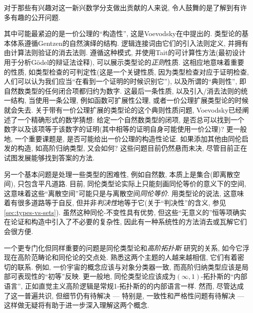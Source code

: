 %

对于那些有兴趣对这一新兴数学分支做出贡献的人来说, 令人鼓舞的是了解到有许多有趣的公开问题. 

%
其中可能最紧迫的是一价公理的``构造性'', 这是Voevodsky在\cite{Universe-poly}中提出的. 
类型论的基本体系遵循Gentzen的自然演绎的结构. 逻辑连接词由它们的引入法则定义, 并拥有由计算法则验证的消去法则. 遵循这种模式, 并使用Tait的可计算性方法(最初设计用于分析G\"odel的辩证法诠释), 可以展示类型论的\emph{正则}性质. 
这相应地意味着重要的性质, 如类型检查的可判定性(这是一个关键性质, 因为类型检查对应于证明检查, 人们可以认为我们应当``在看到一个证明的时候识别它''), 以及所谓的``典则性'', 即自然数类型的任何闭合项都归约为数字. 
这最后一条性质, 以及引入/消去法则的统一结构, 当使用一条公理, 例如函数可扩展性公理, 或者一价公理扩展类型论的时候就会失去.  
关于带有一价公理扩展的类型论的这个典则性质问题, Voevodsky已经阐述了一个精确形式的数学猜想: 给定一个自然数类型的闭项, 是否总可以找到一个数字以及该项等于该数字的证明(其中相等的证明自身可能使用一价公理)? 更一般地, 一个重要课题是, 是否可能给出一价公理的构造性论证. 
如果添加其他由同伦启发的构造, 如高阶归纳类型, 又会如何? 
这些问题目前仍然悬而未决, 尽管目前正在试图发展能够找到答案的方法.  

另一个基本问题是处理一些类型的困难性, 例如自然数, 本质上是集合(即离散空间), 
%
只包含平凡道路. 
目前, 同伦类型论实际上只能刻画同伦等价的意义下的空间, 这意味着这些``离散空间''可能只是与离散空间\emph{同伦等价}. 
用类型论的说法, 这意味着有很多道路等于自反, 但并非\emph{判决性}地等于它(关于``判决性''的含义, 参见\cref{sec:types-vs-sets}). 
虽然这种同伦-不变性具有优势, 但这些``无意义的''恒等项确实在论证和构造中引入了不必要的复杂性, 因此有一种系统性的方法消去或瓦解它们会很方便. 

一个更专门化但同样重要的问题是同伦类型论和\emph{高阶拓扑斯}
研究的关系, 如今它浮现在高阶范畴论和同伦论的交点处.
熟悉这两个主题的人越来越相信, 它们有着密切的联系. 
例如, 一价宇宙的概念应该与对象分类器一致, 而高阶归纳类型应该是局部可表现性的``初等''反映. 
更一般地, 同伦类型论应该成为$(\infty,1)$-拓扑斯的``内部语言'', 正如直觉主义高阶逻辑是常规1-拓扑斯的的内部语言一样. 
然而, 尽管达成了这一普遍共识, 但细节仍有待解决 --- 特别是, 一致性和严格性问题有待解决 --- 这样做无疑将有助于进一步深入理解这两个概念. 

